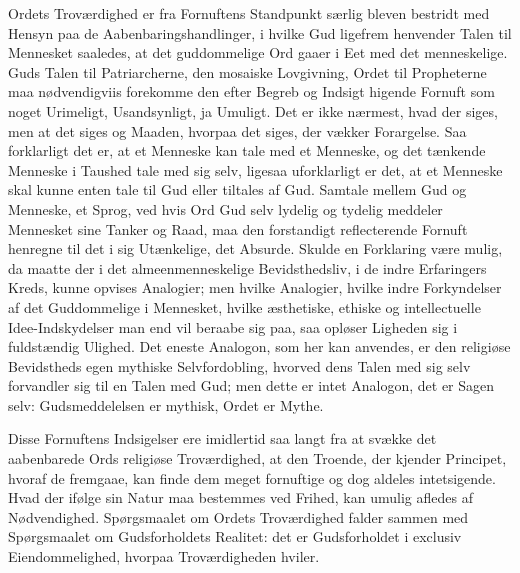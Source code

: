 \documentclass[12pt]{book}
\begin{document}
Ordets Troværdighed er fra Fornuftens Standpunkt særlig bleven
bestridt med Hensyn paa de Aabenbaringshandlinger, i hvilke Gud
ligefrem henvender Talen til Mennesket saaledes, at det guddommelige
Ord gaaer i Eet med det menneskelige. Guds Talen til Patriarcherne,
den mosaiske Lovgivning, Ordet til Propheterne maa nødvendigviis
forekomme den efter Begreb og Indsigt higende Fornuft som noget
Urimeligt, Usandsynligt, ja Umuligt. Det er ikke nærmest, hvad der
siges, men at det siges og Maaden, hvorpaa det siges, der vækker
Forargelse. Saa forklarligt det er, at et Menneske kan tale med et
Menneske, og det tænkende Menneske i Taushed tale med sig selv,
ligesaa uforklarligt er det, at et Menneske skal kunne enten tale
til Gud eller tiltales af Gud. Samtale mellem Gud og Menneske, et
Sprog, ved hvis Ord Gud selv lydelig og tydelig meddeler Mennesket
sine
Tanker og Raad, maa den forstandigt reflecterende Fornuft henregne
til det i sig Utænkelige, det Absurde. Skulde en Forklaring være
mulig, da maatte der i det almeenmenneskelige Bevidsthedsliv, i de
indre Erfaringers Kreds, kunne opvises Analogier; men hvilke
Analogier, hvilke indre Forkyndelser af det Guddommelige i
Mennesket, hvilke æsthetiske, ethiske og intellectuelle
Idee-Indskydelser man end vil beraabe sig paa, saa opløser Ligheden
sig i fuldstændig Ulighed. Det eneste Analogon, som her kan
anvendes, er den religiøse Bevidstheds egen mythiske Selvfordobling,
hvorved dens Talen med sig selv forvandler sig til en Talen med Gud;
men dette er intet Analogon, det er Sagen selv: Gudsmeddelelsen er
mythisk, Ordet er Mythe.

Disse Fornuftens Indsigelser ere imidlertid saa langt fra at svække
det aabenbarede Ords religiøse Troværdighed, at den Troende, der
kjender Principet, hvoraf de fremgaae, kan finde dem meget
fornuftige og dog aldeles intetsigende. Hvad der ifølge sin Natur
maa bestemmes ved Frihed, kan umulig afledes af Nødvendighed.
Spørgsmaalet om Ordets Troværdighed falder sammen med Spørgsmaalet
om Gudsforholdets Realitet: det er Gudsforholdet i exclusiv
Eiendommelighed, hvorpaa Troværdigheden hviler.
\end{document}
